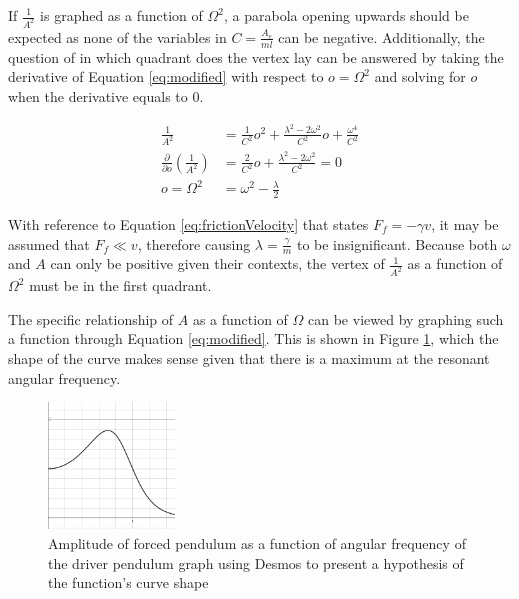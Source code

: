 \documentclass[letterpaper, 12pt]{article}
\begin{document}
If \(\frac{1}{A^2}\) is graphed as a function of \(\Omega^2\),
a parabola opening upwards should be expected as
none of the variables in
\(C = \frac{A_e}{ml}\) can be negative. Additionally,
the question of in which quadrant does the vertex lay can
be answered by taking the derivative of Equation \ref*{eq:modified}
with respect to \(o = \Omega^2\) and solving for \(o\) when
the derivative equals to 0.

\begin{align*}
    \frac{1}{A^2}                                           & = \frac{1}{C^2}o^2+ \frac{\lambda^2 - 2\omega^2}{C^2}o + \frac{\omega^4}{C^2}
    \\
    \frac{\partial}{\partial o}\left( \frac{1}{A^2} \right) & = \frac{2}{C^2}o + \frac{\lambda^2 - 2\omega^2}{C^2} = 0
    \\
    o = \Omega^2                                            & = \omega^2 - \frac{\lambda}{2}
\end{align*}

With reference to Equation \ref*{eq:frictionVelocity} that states
\(F_f = -\gamma v\), it may be assumed that \(F_f \ll v\),
therefore causing \(\lambda = \frac{\gamma}{m}\) to be
insignificant. Because both \(\omega\) and \(A\) can only
be positive given their contexts, the vertex of
\(\frac{1}{A^2}\) as a function of \(\Omega^2\)
must be in the first quadrant.

The specific relationship of \(A\) as a function of \(\Omega\)
can be viewed by graphing such a function through
Equation \ref*{eq:modified}. This is shown in Figure
\ref*{fig:hypothesis}, which the shape of the curve
makes sense given that there is a maximum
at the resonant angular frequency.

\begin{figure}[H]
    \centering
    \includegraphics[width=0.3\textwidth]{hypothesis.png}
    \caption{Amplitude of forced pendulum as a function of angular frequency of the driver pendulum graph using Desmos to present a hypothesis of the function's curve shape}
    \label{fig:hypothesis}
\end{figure}
\end{document}
